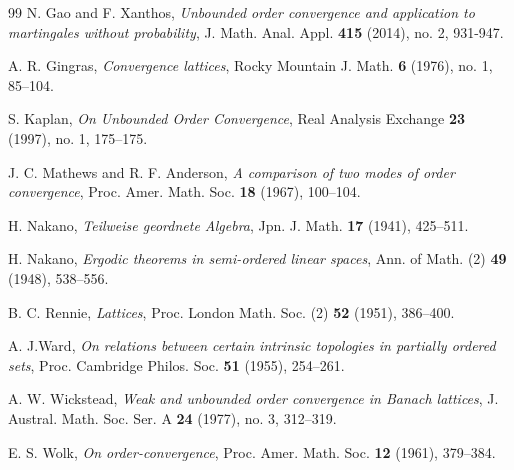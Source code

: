 \documentclass[12pt,a4paper]{amsart}
\numberwithin{equation}{section}
\theoremstyle{definition}
\begin{document}
\begin{thebibliography}{99\kern\bibindent}
	N. Gao and F. Xanthos, \textit{Unbounded order convergence and application to martingales without probability}, J. Math. Anal. Appl. \textbf{415} (2014), no. 2, 931-947.

A. R. Gingras, \textit{Convergence lattices}, Rocky Mountain J. Math. \textbf{6} (1976), no. 1, 85–104.
    
	S. Kaplan, \textit{On Unbounded Order Convergence}, Real Analysis Exchange \textbf{23} (1997), no. 1, 175–175.
	

	J. C. Mathews and R. F. Anderson, \textit{A comparison of two modes of order convergence}, Proc. Amer. Math. Soc. \textbf{18} (1967), 100–104.
		
	H. Nakano, \textit{Teilweise geordnete Algebra}, Jpn. J. Math. \textbf{17} (1941), 425–511.
	
	H. Nakano, \textit{Ergodic theorems in semi-ordered linear spaces}, Ann. of Math. (2) \textbf{49} (1948), 538–556.
	
	
	B. C. Rennie, \textit{Lattices}, Proc. London Math. Soc. (2) \textbf{52} (1951), 386–400.

A. J.Ward, \textit{On relations between certain intrinsic topologies in partially ordered sets}, Proc. Cambridge Philos. Soc. \textbf{51} (1955), 254–261.
    
	A. W. Wickstead, \textit{Weak and unbounded order convergence in Banach lattices}, J. Austral. Math. Soc. Ser. A \textbf{24} (1977), no. 3, 312–319.
	
	
	E. S. Wolk, \textit{On order-convergence}, Proc. Amer. Math. Soc. \textbf{12} (1961), 379–384.
    
\end{thebibliography}
\end{document}
